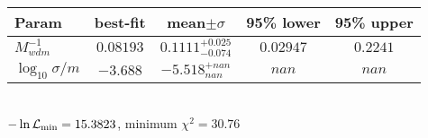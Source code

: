 \begin{tabular}{|l|c|c|c|c|} 
 \hline 
Param & best-fit & mean$\pm\sigma$ & 95\% lower & 95\% upper \\ \hline 
$M_{wdm}^{-1}$ &$0.08193$ & $0.1111_{-0.074}^{+0.025}$ & $0.02947$ & $0.2241$ \\ 
$\log_{10}{\sigma / m}$ &$-3.688$ & $-5.518_{nan}^{+nan}$ & $nan$ & $nan$ \\ 
\hline 
 \end{tabular} \\ 
$-\ln{\cal L}_\mathrm{min} =15.3823$, minimum $\chi^2=30.76$ \\ 
